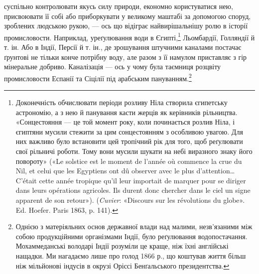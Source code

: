 суспільно контролювати якусь силу природи, економно користуватися
нею, присвоювати її собі або приборкувати у великому
маштабі за допомогою споруд, зроблених людською рукою, —
ось що відіграє найвирішальнішу ролю в історії промисловости.
Наприклад, уреґулювання води в Єгипті,\footnote{
Доконечність обчислювати періоди розливу Ніла створила єгипетську
астрономію, а з нею й панування касти жерців як керівників
рільництва. «Сонцестояння — це той момент року, коли починається
розлив Ніла, і єгиптяни мусили стежити за цим сонцестоянням з особливою
увагою. Для них важливо було встановити цей тропічний рік для
того, щоб реґулювати свої рільничі роботи. Тому вони мусили шукати
на небі виразного знаку його повороту» («Le solstice est le moment de
l’année où commence la crue du Nil, et celui que les Egyptiens ont dû
observer avec le plus d’attention\dots{} C’était cette année tropique qu’il leur
importait de marquer pour se diriger dans leurs opérations agricoles. Ils
durent donc chercher dans le ciel un signe apparent de son retour»). (\emph{Cuvier}:
«Discours sur les révolutions du globe». Ed. Hoefer. Paris 1863, p. 141).
} Льомбардії, Голляндії
й т. ін. Або в Індії, Персії й т. ін., де зрошування штучними
каналами постачає ґрунтові не тільки конче потрібну воду, але
разом з її намулом приставляє з гір мінеральне добриво. Каналізація
— ось у чому була таємниця розцвіту промисловости Еспанії
та Сіцілії під арабським пануванням.\footnote{
Однією з матеріяльних основ державної влади над малими, незв'язаними
між собою продукційними організмами Індії, було реґулювання
водопостачання. Мохаммеданські володарі Індії розуміли це краще,
ніж їхні англійські нащадки. Ми нагадаємо лише про голод 1866 р., що
коштував життя більш ніж мільйонові індусів в окрузі Оріссі Бенґальського
президентства.
}

